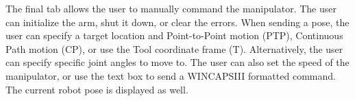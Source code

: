 The final tab allows the user to manually command the manipulator. The user can initialize the arm, shut it down, or clear the errors. When sending a pose, the user can specify a target location and Point-to-Point motion (PTP), Continuous Path motion (CP), or use the Tool coordinate frame (T). Alternatively, the user can specify specific joint angles to move to. The user can also set the speed of the manipulator, or use the text box to send a WINCAPSIII formatted command. The current robot pose is displayed as well.\\